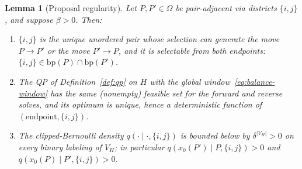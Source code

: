 \documentclass[11pt]{article}
\newtheorem{lemma}{Lemma}[section]
\begin{document}
\begin{lemma}[Proposal regularity]\label{lem:qpmh-regular}
Let $P, P' \in \Omega$ be pair-adjacent via districts $\{i,j\}$, and
suppose $\beta > 0$. Then:
\begin{enumerate}
  \item[(i)] $\{i,j\}$ is the unique unordered pair whose selection
    can generate the move $P \to P'$ or the move $P' \to P$, and it
    is selectable from both endpoints:
    $\{i,j\} \in \mathrm{bp}(P) \cap \mathrm{bp}(P')$.
  \item[(ii)] The QP of Definition~\ref{def:qp} on $H$ with the
    global window~\eqref{eq:balance-window} has the same (nonempty)
    feasible set for the forward and reverse solves, and its optimum
    is unique, hence a deterministic function of
    $(\text{endpoint}, \{i,j\})$.
  \item[(iii)] The clipped-Bernoulli density
    $q(\cdot \mid \cdot, \{i,j\})$ is bounded below by
    $\delta^{|V_H|} > 0$ on every binary labeling of $V_H$; in
    particular $q(x_0(P') \mid P, \{i,j\}) > 0$ and
    $q(x_0(P) \mid P', \{i,j\}) > 0$.
\end{enumerate}
\end{lemma}
\end{document}
